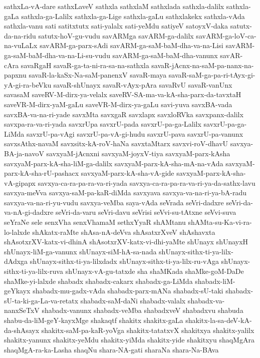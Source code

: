 {sathxLa-vA-dare
sathxLaveV
sathxla
sathxlaM
sathxlada
sathxla-dalilx
sathxla-gaLa
sathxla-ga-Lalilx
sathxla-ga-Lige
sathxla-gaLu
sathxlakekx
sathxla-vAda
sathxla-vanu
sati
satitxtutx
sati-yalalx
sati-yeMdu
satiyeV
satoyxV-daka
satutx-da-na-ridu
satutx-hoV-gu-vudu
savARMga
savARM-ga-dalilx
savARM-ga-loV-ca-na-vuLaLx
savARM-ga-parx-sAdi
savARM-ga-saM-baM-dha-va-na-Lisi
savARM-ga-saM-baM-dha-va-na-Li-su-vudu
savARM-ga-saM-baM-dha-vanunx
savAR-cAra
savaRgaH
savaR-ga-ta-ni-ra-sa-na-sathxla
savaR-jAcnx-na-saM-pa-nanx-na-papxnu
savaR-la-kaSx-Na-saM-panenxV
savaR-maya
savaR-saM-ga-pa-ri-tAyx-gi-yA-gi-ra-beVku
savaR-shUnayx
savaR-vAyx-pAra
savaRvU
savaR-vanUnx
savasaM
saveRV-M-dirx-ya-velalx
saveRV-SA-ma-va-kA-sha-parx-da-tavxtaH
saveVR-M-dirx-yaM-gaLu
saveVR-M-dirx-ya-gaLu
savi-yuva
savxBA-vada
savxBA-va-na-ri-yade
savxMta
savxgaR
savxlapx
savxloRVka
savxpanx-dalilx
savxpa-ra-va-ri-yada
savxrUpa
savxrU-pada
savxrU-pa-ga-Lalilx
savxrU-pa-ga-LiMda
savxrU-pa-vAgi
savxrU-pa-vA-gi-hudu
savxrU-pava
savxrU-pa-vanunx
savxsAthx-navaM
savxsitx-kA-roV-haNa
savxtaMtarx
savxvi-roV-dhavU
savxya-BA-ja-navoV
savxyaM-jAcnxni
savxyaM-joyxV-tiya
savxyaM-parx-kAsha
savxyaM-parx-kA-sha-liM-ga-dalilx
savxyaM-parx-kA-sha-mA-na-vAda
savxyaM-parx-kA-sha-rU-pashacx
savxyaM-parx-kA-sha-vA-gide
savxyaM-parx-kA-sha-vA-gipapx
savxya-ca-ra-pa-ra-va-ri-yada
savxya-ca-ra-pa-ra-va-ri-ya-da-sathx-lavu
savxya-meVva
savxya-saM-pa-kaR-diMda
savxyava
savxya-va-na-ri-ya-bA-radu
savxya-va-na-ri-yu-vudu
savxya-veMba
saya-vAda
seVrada
seVri-dadxre
seVri-da-va-nA-gi-dadxre
seVri-da-varu
seVri-davu
seVrisi
seVvi-su-tAtxne
seVvi-suva
seYraNe
sele
senxVha
senxVhamaM
sethxYyaR
shAMtanu
shAMta-su-Ka-vi-ra-lo-lalxde
shAkatx-raMte
shAsa-nA-deVva
shAsatxrXveV
shAshavxta
shAsotxrXV-katx-vi-dhinA
shAsotxrXV-katx-vi-dhi-yaMte
shUnayx
shUnayxH
shUnayx-liM-ga-vanunx
shUnayx-siM-hA-sa-nada
shUnayx-sithx-ti-ya-lilx-dAdxga
shUnayx-sithx-ti-ya-lilxdadx
shUnayx-sithx-ti-ya-lilx-ru-vAga
shUnayx-sithx-ti-ya-lilx-ruva
shUnayx-vA-gu-tatxde
sha
shaMKada
shaMke-goM-DaDe
shaMke-yi-lalxde
shabadx
shabadx-cakarx
shabadx-ga-LiMda
shabadx-liM-geYkayx
shabadx-mu-gadx-vAda
shabadx-parx-mANa
shabadx-sU-taki
shabadx-sU-ta-ki-ga-La-va-retatx
shabadx-saM-daNi
shabadx-valalx
shabadx-va-nanxSeTxV
shabadx-vanunx
shabadx-veMba
shabadxveV
shabadxvu
shabuda
shabu-da-liM-geY-kayxMge
shakaqtf
shakitx
shakitx-gaLa
shakitx-la-sa-deV-kA-da-shAsayx
shakitx-saM-pa-kaR-yoVga
shakitx-tatatxvX
shakitxya
shakitx-yalilx
shakitx-yanunx
shakitx-yeMdu
shakitx-yiMda
shakitx-yide
shakitxyu
shaqMgAra
shaqMgA-ra-ka-Lasha
shaqNu
shara-NA-gati
sharaNa
shara-Na-BAva
}
